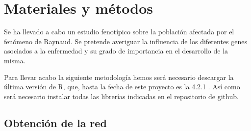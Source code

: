 \section{Materiales y métodos}

Se ha llevado a cabo un estudio fenotípico sobre la población afectada por el fenómeno de Raynaud. Se pretende averiguar la influencia de los diferentes genes asociados a la enfermedad y su grado de importancia en el desarrollo de la misma.

Para llevar acabo la siguiente metodología hemos será necesario descargar la última versión de R, que, hasta la fecha de este proyecto es la 4.2.1 . Así como será necesario instalar todas las librerías indicadas en el repositorio de github.

\begin{minipage}{\linewidth}
	\vspace{15pt}
	\vspace{3pt}
	\label{fig:workflow}
\end{minipage}

\subsection{Obtención de la red}
\label{obtencion_red}

